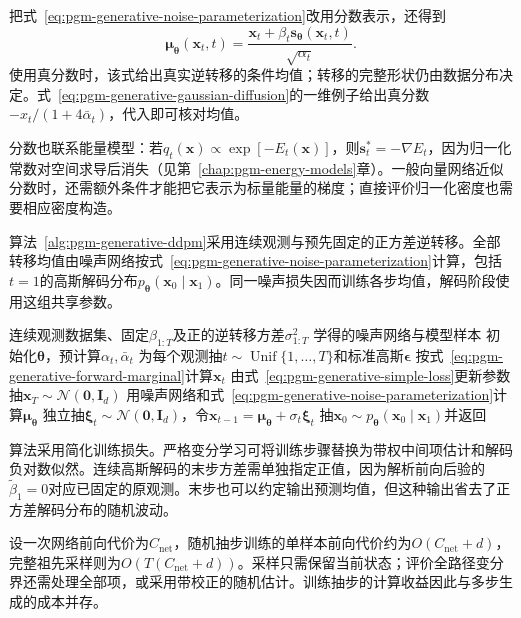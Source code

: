 把式~\eqref{eq:pgm-generative-noise-parameterization}改用分数表示，还得到
\[
  \bm{\mu}_{\bm{\theta}}(\bm{x}_t,t)
    =\frac{\bm{x}_t+\beta_t\bm{s}_{\bm{\theta}}(\bm{x}_t,t)}
            {\sqrt{\alpha_t}}.
\]
使用真分数时，该式给出真实逆转移的条件均值；转移的完整形状仍由数据分布决定。式~\eqref{eq:pgm-generative-gaussian-diffusion}的一维例子给出真分数$-x_t/(1+4\bar{\alpha}_t)$，代入即可核对均值。

分数也联系能量模型：若$q_t(\bm{x})\propto\exp[-E_t(\bm{x})]$，则$\bm{s}_t^*=-\nabla E_t$，因为归一化常数对空间求导后消失（见第~\ref{chap:pgm-energy-models}章）。一般向量网络近似分数时，还需额外条件才能把它表示为标量能量的梯度；直接评价归一化密度也需要相应密度构造。

算法~\ref{alg:pgm-generative-ddpm}采用连续观测与预先固定的正方差逆转移。全部转移均值由噪声网络按式~\eqref{eq:pgm-generative-noise-parameterization}计算，包括$t=1$的高斯解码分布$p_{\bm{\theta}}(\bm{x}_0\mid\bm{x}_1)$。同一噪声损失因而训练各步均值，解码阶段使用这组共享参数。

\begin{algorithm}[固定方差DDPM的学习与祖先采样]
  \label{alg:pgm-generative-ddpm}
  \begin{algorithmic}[1]
    \Require 连续观测数据集、固定$\beta_{1:T}$及正的逆转移方差$\sigma_{1:T}^2$
    \Ensure 学得的噪声网络与模型样本
    \State 初始化$\bm{\theta}$，预计算$\alpha_t,\bar{\alpha}_t$
      \State 为每个观测抽$t\sim\operatorname{Unif}\{1,\ldots,T\}$和标准高斯$\bm{\epsilon}$
      \State 按式~\eqref{eq:pgm-generative-forward-marginal}计算$\bm{x}_t$
      \State 由式~\eqref{eq:pgm-generative-simple-loss}更新参数
    \EndFor
    \State 抽$\bm{x}_T\sim\mathcal{N}(\bm{0},\bm{I}_d)$
      \State 用噪声网络和式~\eqref{eq:pgm-generative-noise-parameterization}计算$\bm{\mu}_{\bm{\theta}}$
      \State 独立抽$\bm{\xi}_t\sim\mathcal{N}(\bm{0},\bm{I}_d)$，令$\bm{x}_{t-1}=\bm{\mu}_{\bm{\theta}}+\sigma_t\bm{\xi}_t$
    \EndFor
    \State 抽$\bm{x}_0\sim p_{\bm{\theta}}(\bm{x}_0\mid\bm{x}_1)$并返回
  \end{algorithmic}
\end{algorithm}

算法采用简化训练损失。严格变分学习可将训练步骤替换为带权中间项估计和解码负对数似然。连续高斯解码的末步方差需单独指定正值，因为解析前向后验的$\widetilde{\beta}_1=0$对应已固定的原观测。末步也可以约定输出预测均值，但这种输出省去了正方差解码分布的随机波动。

设一次网络前向代价为$C_{\mathrm{net}}$，随机抽步训练的单样本前向代价约为$O(C_{\mathrm{net}}+d)$，完整祖先采样则为$O(T(C_{\mathrm{net}}+d))$。采样只需保留当前状态；评价全路径变分界还需处理全部项，或采用带校正的随机估计。训练抽步的计算收益因此与多步生成的成本并存。

